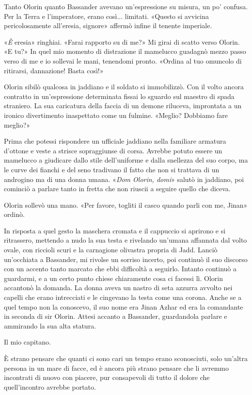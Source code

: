 Tanto Olorin quanto Bassander avevano un'espressione su misura, un po'
confusa. Per la Terra e l'imperatore, erano così... limitati. «Questo si
avvicina pericolosamente all'eresia, signore» affermò infine il tenente
imperiale.

«\emph{È} eresia» ringhiai. «Farai rapporto su di me?» Mi girai di
scatto verso Olorin. «E tu?» In quel mio momento di distrazione il
mamelucco guadagnò mezzo passo verso di me e io sollevai le mani,
{tenendomi} pronto. «Ordina al tuo omuncolo di ritirarsi, dannazione!
Basta così!»

Olorin sibilò qualcosa in jaddiano e il soldato si immobilizzò. Con il
volto ancora contratto in un'espressione determinata fissai lo sguardo
sul maestro di spada straniero. La sua caricatura della faccia di un
demone riluceva, improntata a un ironico divertimento inaspettato come
un fulmine. «Meglio? Dobbiamo fare meglio?»

Prima che potessi rispondere un ufficiale jaddiano nella familiare
armatura d'ottone e veste a strisce sopraggiunse di corsa. Avrebbe
potuto essere un mamelucco a giudicare dallo stile dell'uniforme e dalla
snellezza del suo corpo, ma le curve dei fianchi e del seno tradivano il
fatto che non si trattava di un androgino ma di una donna umana.
«\emph{Dom Olorin, domi}» salutò in jaddiano, poi cominciò a parlare
tanto in fretta che non riuscii a seguire quello che diceva.

Olorin sollevò una mano. «Per favore, togliti il casco quando parli con
me, Jinan» ordinò.

In risposta a quel gesto la maschera cromata e il cappuccio si aprirono
e si ritrassero, mettendo a nudo la sua testa e rivelando un'umana
affannata dal volto ovale, con riccioli scuri e la carnagione olivastra
propria di Jadd. Lanciò un'occhiata a Bassander, mi rivolse un sorriso
incerto, poi continuò il suo discorso con un accento tanto marcato che
ebbi difficoltà a seguirlo. Intanto continuò a guardarmi, e a un certo
punto chiese chiaramente cosa ci facessi lì. Olorin accantonò la
domanda. La donna aveva un nastro di seta azzurra avvolto nei capelli
che erano intrecciati e le cingevano la testa come una corona. Anche se
a quel tempo non la conoscevo, il suo nome era Jinan Azhar ed era la
comandante in seconda di sir Olorin. Attesi accanto a Bassander,
guardandola parlare e ammirando la sua alta statura.

Il mio capitano.

È strano pensare che quanti ci sono cari un tempo erano sconosciuti,
solo un'altra persona in un mare di facce, ed è ancora più strano
pensare che li avremmo incontrati di nuovo con piacere, pur consapevoli
di tutto il dolore che quell'incontro avrebbe portato.

